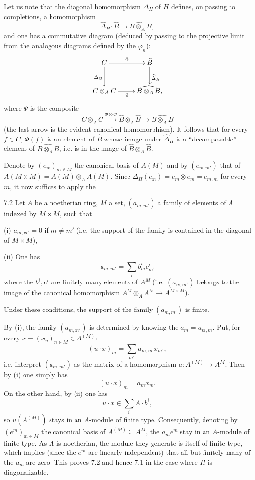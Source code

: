 Let us note that the diagonal homomorphism $\Delta_H$ of $H$ defines, on passing to completions, a homomorphism
\[
\widehat\Delta_H:\widehat B\to\widehat{B\otimes_A B},
\]
and one has a commutative diagram (deduced by passing to the projective limit from the analogous diagrams defined by the $\varphi_n$):
\[
\xymatrix{C\ar[r]^\Phi\ar[d]_{\Delta_G}&\widehat B\ar[d]^{\widehat\Delta_H}\\C\otimes_A C\ar[r]_\Psi&\widehat{B\otimes_A B},}
\]
where $\Psi$ is the composite
\[
C\otimes_A C\xrightarrow{\Phi\otimes\Phi}\widehat B\otimes_A\widehat B\to\widehat{B\otimes_A B}
\]
(the last arrow is the evident canonical homomorphism). It follows that for every $f\in C$, $\Phi(f)$ is an element of $\widehat B$ whose image under $\widehat\Delta_H$ is a ``decomposable'' element of $\widehat{B\otimes_A B}$, i.e. is in the image of $\widehat B\otimes_A\widehat B$.

Denote by $(e_m)_{m\in M}$ the canonical basis of $A(M)$ and by $(e_{m,m'})$ that of $A(M\times M)=A(M)\otimes_A A(M)$. Since $\Delta_H(e_m)=e_m\otimes e_m=e_{m,m}$ for every $m$, it now suffices to apply the
\begin{lemma}{7.2}\label{IX.7.2}
Let $A$ be a noetherian ring, $M$ a set, $(a_{m,m'})$ a family of elements of $A$ indexed by $M\times M$, such that

(i) $a_{m,m'}=0$ if $m\ne m'$ (i.e. the support of the family is contained in the diagonal of $M\times M$),

(ii) One has
\[
a_{m,m'}=\sum_i b^i_m c^i_{m'}
\]
where the $b^i,c^i$ are finitely many elements of $A^M$ (i.e. $(a_{m,m'})$ belongs to the image of the canonical homomorphism $A^M\otimes_A A^M\to A^{M\times M}$).

Under these conditions, the support of the family $(a_{m,m'})$ is finite.
\end{lemma}
By (i), the family $(a_{m,m'})$ is determined by knowing the $a_m=a_{m,m}$. Put, for every $x=(x_n)_{n\in M}\in A^{(M)}$:
\[
(u\cdot x)_m=\sum_{m'}a_{m,m'}x_{m'},
\]
i.e. interpret $(a_{m,m'})$ as the matrix of a homomorphism $u:A^{(M)}\to A^M$. Then by (i) one simply has
\[
(u\cdot x)_m=a_m x_m.
\]
On the other hand, by (ii) one has
\[
u\cdot x\in\sum_i A\cdot b^i,
\]
so $u(A^{(M)})$ stays in an $A$-module of finite type. Consequently, denoting by $(e^m)_{m\in M}$ the canonical basis of $A^{(M)}\subseteq A^M$, the $a_me^m$ stay in an $A$-module of finite type. As $A$ is noetherian, the module they generate is itself of finite type, which implies (since the $e^m$ are linearly independent) that all but finitely many of the $a_m$ are zero. This proves 7.2 and hence 7.1 in the case where $H$ is diagonalizable.

